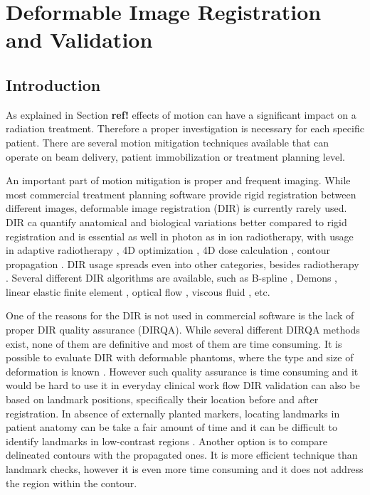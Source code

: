 \documentclass[type=dr, dr=rernat, accentcolor=tud7b,colorbacktitle, bigchapter, openright, twoside, 12pt ]{tudthesis}
\begin{document}
\chapter{Deformable Image Registration and Validation}
\label{chapter:vmm}
\minitoc

\section{Introduction}

As explained in Section \textbf{ref!} effects of motion can have a significant impact on a radiation treatment. Therefore a proper investigation is necessary for each specific patient. There are several motion mitigation techniques available that can operate on beam delivery, patient immobilization or treatment planning level.

An important part of motion mitigation is proper and frequent imaging. While most commercial treatment planning software provide rigid registration between different images, deformable image registration (DIR) is currently rarely used. 
DIR ca quantify anatomical and biological variations better compared to rigid registration \cite{Sarrut2006} and is essential as well in photon as in ion radiotherapy, with usage in adaptive radiotherapy \cite{Yan1997,Yan2010}, 
4D optimization \cite{Trofimov2005}, 4D dose calculation \cite{Flampouri2006}, contour propagation \cite{Lu2006b}. DIR usage spreads even into other categories, besides radiotherapy \cite{Cleary2010, Herrell2012, Nithiananthan2011, Naini2010}.
Several different DIR algorithms are available, such as B-spline \cite{Rueckert1999}, Demons \cite{Thirion1998}, linear elastic finite element \cite{Venugopal2005}, optical flow \cite{Zhong2007}, viscous fluid \cite{Christensen1996}, etc.
	
One of the reasons for the DIR is not used in commercial software is the lack of proper DIR quality assurance (DIRQA). While several different DIRQA methods exist, none of them are definitive and most of them are time consuming. 
It is possible to evaluate DIR with deformable phantoms, where the type and size of deformation is known \cite{Kashani2007, Kirby2011}. However such quality assurance is time consuming and it would be hard to use it 
in everyday clinical work flow DIR validation can also be based on landmark positions, specifically their location before and after registration. In absence of externally planted markers, locating landmarks in patient 
anatomy can be take a fair amount of time and it can be difficult to identify landmarks in low-contrast regions \cite{Varadhan2013}. Another option is to compare delineated contours with the propagated ones. 
It is more efficient technique than landmark checks, however it is even more time consuming and it does not address the region within the contour.
\end{document}
